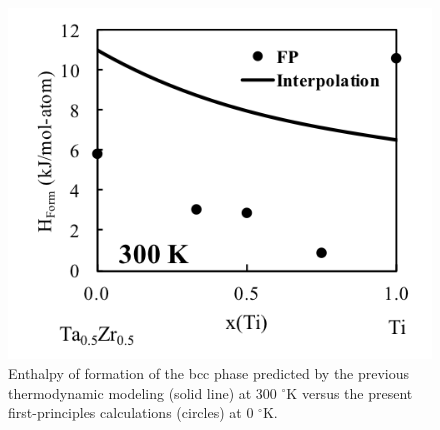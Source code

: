 \newpage
\begin{figure}[H]
	\centering
	\includegraphics{Chapter-3/Figures/TiTaZr2.png}
	\caption{Enthalpy of formation of the bcc phase predicted by the previous thermodynamic modeling (solid line) at 300 $^{\circ}$K versus the present first-principles calculations (circles) at 0 $^{\circ}$K.}
	\label{Ch3-figure:TiTaZr2}
\end{figure}
